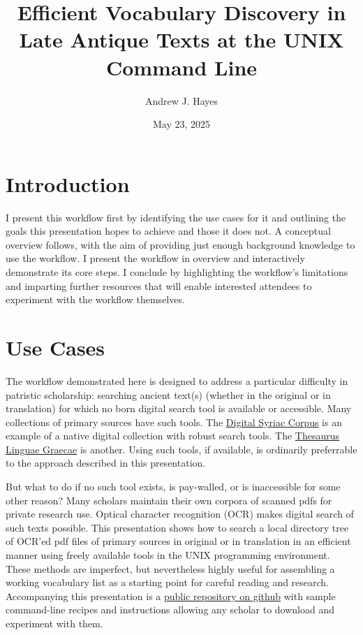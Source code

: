 \documentclass[
  letterpaper,
]{tufte-handout}
\title{Efficient Vocabulary Discovery in Late Antique Texts at the UNIX
Command Line}
\author{Andrew J. Hayes}
\date{May 23, 2025}
\begin{document}
\maketitle

\section{Introduction}\label{introduction}

I present this workflow first by identifying the use cases for it and
outlining the goals this presentation hopes to achieve and those it does
not. A conceptual overview follows, with the aim of providing just
enough background knowledge to use the workflow. I present the workflow
in overview and interactively demonstrate its core steps. I conclude by
highlighting the workflow's limitations and imparting further resources
that will enable interested attendees to experiment with the workflow
themselves.

\section{Use Cases}\label{use-cases}

The workflow demonstrated here is designed to address a particular
difficulty in patristic scholarship: searching ancient text(s) (whether
in the original or in translation) for which no born digital search tool
is available or accessible. Many collections of primary sources have
such tools. The \href{https://syriaccorpus.org/index.html}{Digital
Syriac Corpus} is an example of a native digital collection with robust
search tools. The \href{https://stephanus.tlg.uci.edu}{Thesaurus Linguae
Graecae} is another. Using such tools, if available, is ordinarily
preferrable to the approach described in this presentation.

But what to do if no such tool exists, is pay-walled, or is inaccessible
for some other reason? Many scholars maintain their own corpora of
scanned pdfs for private research use. Optical character recognition
(OCR) makes digital search of such texts possible. This presentation
shows how to search a local directory tree of OCR'ed pdf files of
primary sources in original or in translation in an efficient manner
using freely available tools in the UNIX programming environment. These
methods are imperfect, but nevertheless highly useful for assembling a
working vocabulary list as a starting point for careful reading and
research. Accompanying this presentation is a
\href{==insert\%20link==}{public repository on github} with sample
command-line recipes and instructions allowing any scholar to download
and experiment with them.
\end{document}

